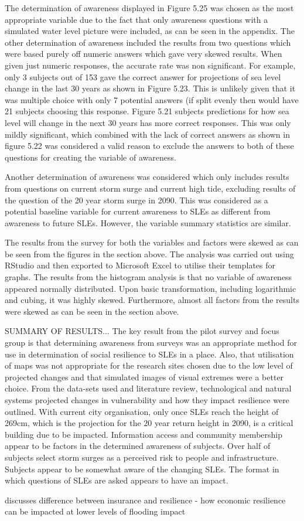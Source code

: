 The determination of awareness displayed in Figure 5.25 was chosen as the most appropriate variable due to the fact that only awareness questions with a simulated water level picture were included, as can be seen in the appendix. The other determination of awareness included the results from two questions which were based purely off numeric answers which gave very skewed results. When given just numeric responses, the accurate rate was non significant. For example, only 3 subjects out of 153 gave the correct answer for projections of sea level change in the last 30 years as shown in Figure 5.23.  This is unlikely given that it was multiple choice with only 7 potential answers (if split evenly then would have 21 subjects choosing this response. Figure 5.21 subjects predictions for how sea level will change in the next 30 years has more correct responses. This was only mildly significant, which combined with the lack of correct answers as shown in figure 5.22 was considered a valid reason to exclude the answers to both of these questions for creating the variable of awareness. 


Another determination of awareness was considered which only includes results from questions on current storm surge and current high tide, excluding results of the question of the 20 year storm surge in 2090. This was considered as a potential baseline variable for current awareness to SLEs as different from awareness to future SLEs. However, the variable summary statistics are similar.



The results from the survey for both the variables and factors were skewed as can be seen from the figures in the section above. The analysis was carried out using RStudio and then exported to Microsoft Excel to utilise their templates for graphs. The results from the histogram analysis is that no variable of awareness appeared normally distributed. Upon basic transformation, including logarithmic and cubing, it was highly skewed. Furthermore, almost all factors from the results were skewed as can be seen in the section above. 


SUMMARY OF RESULTS...
The key result from the pilot survey and focus group is that determining awareness from surveys was an appropriate method for use in determination of social resilience to SLEs in a place. Also, that utilisation of maps was not appropriate for the research sites chosen due to the low level of projected changes and that simulated images of visual extremes were a better choice. From the data-sets used and literature review, technological and natural systems projected changes in vulnerability and how they impact resilience were outlined. With current city organisation, only once SLEs reach the height of 269cm, which is the projection for the 20 year return height in 2090, is a critical building due to be impacted. Information access and community membership appear to be factors in the determined awareness of subjects. Over half of subjects select storm surges as a perceived risk to people and infrastructure. Subjects appear to be somewhat aware of the changing SLEs. The format in which questions of SLEs are asked appears to have an impact. 


\cite{cutter_community_2020} discusses difference between insurance and resilience - how economic resilience can be impacted at lower levels of flooding impact